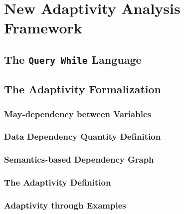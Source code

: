 \documentclass[12pt, letterpaper]{report}   %
\begin{document}
\chapter{New Adaptivity Analysis Framework}
\label{sec:adapt-analysis}


\clearpage
\section{The {\tt Query While} Language}
\label{sec:adapt-language}


\clearpage
\section{The Adaptivity Formalization}
\label{sec:adapt-exe}


\subsection{May-dependency between Variables}
\label{sec:dynamic-datadep}
% 


\subsection{Data Dependency Quantity Definition}
\label{sec:dynamic-reachability}

\subsection{Semantics-based Dependency Graph}
\label{sec:dynamic-graph}


\subsection{The Adaptivity Definition}
\label{sec:dynamic-adapt}
% 

%
%



\subsection{Adaptivity through Examples}
\label{sec:dynamic-examples}
%
\end{document}
